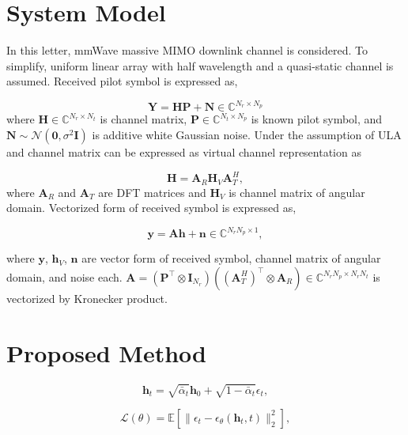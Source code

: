 \documentclass[lettersize,journal]{IEEEtran}
\begin{document}
\section{System Model}

In this letter, mmWave massive MIMO downlink channel is considered. To simplify, uniform linear array with half wavelength and a quasi-static channel is assumed. Received pilot symbol is expressed as, 

\begin{equation}
\mathbf{Y}=\mathbf{H}\mathbf{P}+\mathbf{N}\in \mathbb{C}^{N_{r}\times N_{p}}
\end{equation}
where $\mathbf{H}\in \mathbb{C}^{N_{r}\times N_{t}}$ is channel matrix, $\mathbf{P}\in \mathbb{C}^{N_{t}\times N_{p}}$ is known pilot symbol, and $\mathbf{N}\sim\mathcal{N}(\mathbf{0},\sigma^{2}\mathbf{I})$ is additive white Gaussian noise. Under the assumption of ULA and channel matrix can be expressed as virtual channel representation as 

\begin{equation}
\mathbf{H} = \mathbf{A}_{R}\mathbf{H}_{V}\mathbf{A}_{T}^{H},
\end{equation}
where $\mathbf{A}_{R}$ and $\mathbf{A}_{T}$ are DFT matrices and $\mathbf{H}_{V}$ is channel matrix of angular domain. Vectorized form of received symbol is expressed as,

\begin{equation}
\mathbf{y} = \mathbf{A}\mathbf{h}+\mathbf{n}\in \mathbb{C}^{N_{r}N_{p}\times 1},
\end{equation}

where $\mathbf{y}$, $\mathbf{h}_{V}$, $\mathbf{n}$ are vector form of received symbol, channel matrix of angular domain, and noise each. $\mathbf{A}=(\mathbf{P}^{\top}\otimes\mathbf{I}_{N_{r}})((\mathbf{A}_{T}^{H})^{\top}\otimes \mathbf{A}_{R})\in \mathbb{C}^{N_{r}N_{p}\times N_{r}N_{t}}$ is vectorized by Kronecker product.

\section{Proposed Method}

\begin{equation}
\mathbf{h}_{t} = \sqrt{ \bar{\alpha}_{t} }\mathbf{h}_{0} + \sqrt{ 1-\bar{\alpha}_{t} }\epsilon_{t},
\end{equation}

\begin{equation}
\mathcal{L}(\theta) = \mathbb{E}[\|\epsilon_{t} - \epsilon_{\theta}(\mathbf{h}_{t},t)\|_{2}^{2}],
\end{equation}
\end{document}
